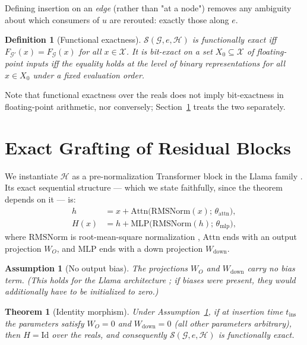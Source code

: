 \documentclass[11pt,a4paper]{article}
\newtheorem{theorem}{Theorem}
\newtheorem{definition}{Definition}
\newtheorem{assumption}{Assumption}
\newcommand{\G}{\mathcal{G}}
\newcommand{\Gp}{\mathcal{G}'}
\newcommand{\Hb}{\mathcal{H}}
\newcommand{\Surg}{\mathcal{S}}
\begin{document}
Defining insertion on an \emph{edge} (rather than "at a node") removes any ambiguity about which consumers of $u$ are rerouted: exactly those along $e$.

\begin{definition}[Functional exactness]
$\Surg(\G, e, \Hb)$ is \emph{functionally exact} iff $F_{\Gp}(x) = F_{\G}(x)$ for all $x \in \mathcal{X}$. It is \emph{bit-exact} on a set $X_0 \subseteq \mathcal{X}$ of floating-point inputs iff the equality holds at the level of binary representations for all $x \in X_0$ under a fixed evaluation order.
\end{definition}

Note that functional exactness over the reals does not imply bit-exactness in floating-point arithmetic, nor conversely; Section~\ref{sec:exact} treats the two separately.

\section{Exact Grafting of Residual Blocks}
\label{sec:exact}

We instantiate $\Hb$ as a pre-normalization Transformer block in the Llama family \cite{llama}. Its exact sequential structure --- which we state faithfully, since the theorem depends on it --- is:
\begin{align}
    h &= x + \mathrm{Attn}\big(\mathrm{RMSNorm}(x);\, \theta_{\mathrm{attn}}\big), \label{eq:block1}\\
    H(x) &= h + \mathrm{MLP}\big(\mathrm{RMSNorm}(h);\, \theta_{\mathrm{mlp}}\big), \label{eq:block2}
\end{align}
where $\mathrm{RMSNorm}$ is root-mean-square normalization \cite{rmsnorm}, $\mathrm{Attn}$ ends with an output projection $W_O$, and $\mathrm{MLP}$ ends with a down projection $W_{\mathrm{down}}$.

\begin{assumption}[No output bias]
\label{ass:nobias}
The projections $W_O$ and $W_{\mathrm{down}}$ carry no bias term. (This holds for the Llama architecture \cite{llama}; if biases were present, they would additionally have to be initialized to zero.)
\end{assumption}

\begin{theorem}[Identity morphism]
\label{thm:identity}
Under Assumption~\ref{ass:nobias}, if at insertion time $t_{\mathrm{ins}}$ the parameters satisfy $W_O = 0$ and $W_{\mathrm{down}} = 0$ (all other parameters arbitrary), then $H = \mathrm{Id}$ over the reals, and consequently $\Surg(\G, e, \Hb)$ is functionally exact.
\end{theorem}
\end{document}
